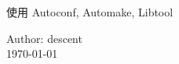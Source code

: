 \begin{titlepage}
\fontsize{30}{30pt plus.5pt minux.4pt}\selectfont
\noindent
使用 Autoconf, Automake, Libtool

\fontsize{14}{20pt plus.5pt minux.4pt}\selectfont
\par\vfill\noindent

Author: descent\\

\today


\end{titlepage}
